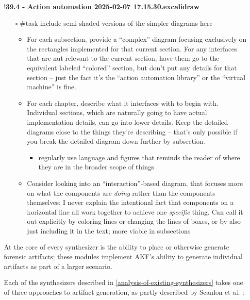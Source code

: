 \documentclass[letterpaper,12pt]{report}
\def\tightlist{}
\begin{document}
!\textbf{39.4 - Action automation 2025-02-07 17.15.30.excalidraw}

\begin{itemize}
\tightlist
\item[$\square$]
  \#task include semi-shaded versions of the simpler diagrams here

  \begin{itemize}
  \tightlist
  \item
    For each subsection, provide a ``complex'' diagram focusing
    exclusively on the rectangles implemented for that current section.
    For any interfaces that are nut relevant to the current section,
    have them go to the equivalent labeled ``colored'' section, but
    don't put any details for that section -- just the fact it's the
    ``action automation library'' or the ``virtual machine'' is fine.
  \item
    For each chapter, describe what it interfaces with to begin with.
    Individual sections, which are naturally going to have actual
    implementation details, can go into lower details. Keep the detailed
    diagrams close to the things they're describing -- that's only
    possible if you break the detailed diagram down further by
    subsection.

    \begin{itemize}
    \tightlist
    \item
      regularly use language and figures that reminds the reader of
      where they are in the broader scope of things
    \end{itemize}
  \item
    Consider looking into an ``interaction''-based diagram, that focuses
    more on what the components are \emph{doing} rather than the
    components themselves; I never explain the intentional fact that
    components on a horizontal line all work together to achieve one
    \emph{specific} thing. Can call it out explicitly by coloring lines
    or changing the lines of boxes, or by also just including it in the
    text; more viable in subsections
  \end{itemize}
\end{itemize}

At the core of every synthesizer is the ability to place or otherwise
generate forensic artifacts; these modules implement AKF's ability to
generate individual artifacts as part of a larger scenario.

Each of the synthesizers described in \autoref{analysis-of-existing-synthesizers} takes one of three
approaches to artifact generation, as partly described by Scanlon et al.
\cite{scanlonEviPlantEfficientDigital2017}:
\end{document}
